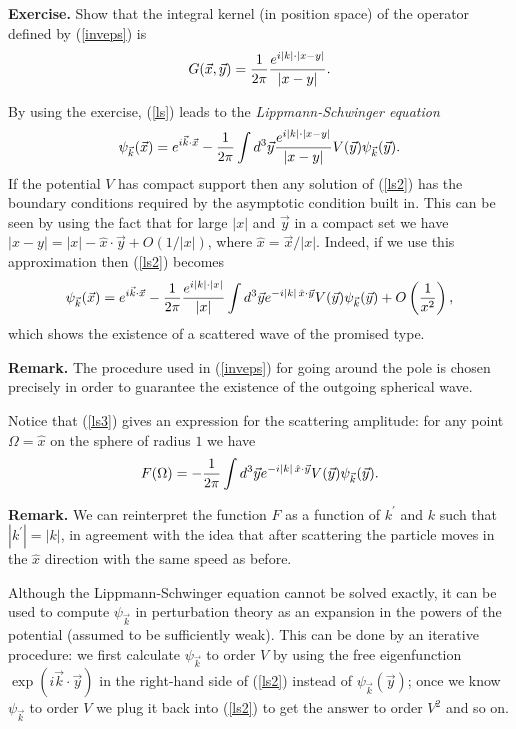 \documentclass[11pt]{article}
\def\p{\pi}
\def\O{\Omega}
\newcommand{\vk}{{\vec{k}}}
\newcommand{\vy}{{\vec{y}}}
\newcommand{\vx}{{\vec{x}}}
\newcommand{\equ}[1]{\begin{equation}{#1}\end{equation}}
\begin{document}
{\bf Exercise.} Show that the integral kernel (in position
space) of the operator defined
 by (\ref{inveps}) is
\equ{\label{intker} G(\vx,\vy) = \frac{1}{2\p} 
\frac{e^{i|k|\cdot|x-y|}}{|x-y|}. }

By using the exercise, (\ref{ls}) leads to the {\em Lippmann-Schwinger equation}
\equ{\label{ls2}\psi_\vk (\vx ) = e^{i\vk\cdot\vx}-\frac{1}{2\p} \int d^3 \vy
\frac{e^{i|k|\cdot|x-y|}}{|x-y|} V(\vy ) \psi_\vk (\vy ). }
If the potential $V$ has compact support then any solution of (\ref{ls2})
has the boundary conditions required by the asymptotic condition built in. This
can be seen by using the fact that for large $|x|$ and $\vy$ in a compact set
we have $|x-y|= |x|- \hat{x}\cdot \vy + O(1/|x| )$, where $\hat{x}= \vx/ |x|$. 
Indeed, if we use this approximation then (\ref{ls2}) becomes
\equ{ \label{ls3}\psi_\vk (\vx ) = e^{i\vk\cdot\vx}-\frac{1}{2\p}
\frac{e^{i|k|\cdot |x|}}{|x|} \int d^3 \vy e^{-i|k|\,\hat{x}\cdot\vy} V(\vy )
\psi_\vk (\vy ) + O\left( \frac{1}{x^2} \right) , }
which shows the existence of a scattered wave of the promised type. 

{\bf Remark.} The procedure used in (\ref{inveps}) for going around the pole
is chosen precisely in order to guarantee the existence of the outgoing
spherical wave.

Notice that (\ref{ls3}) gives an expression for the scattering amplitude: for any
point $\O = \hat{x}$ on the sphere of radius $1$ we have
\equ{\label{ampl}
 F(\O )= -\frac{1}{2\p} \int d^3 \vy e^{-i|k|\,\hat{x}\cdot\vy} V(\vy )
\psi_\vk (\vy ) .}

{\bf Remark.} We can reinterpret the function $F$ as a function of
$k^\prime$ and $k$ such that $|k^\prime | = |k|$, in agreement with the 
idea that after scattering the particle moves in the $\hat{x}$ direction
with the same speed as before.

Although the Lippmann-Schwinger equation cannot be solved exactly, it can be used
to compute $\psi_\vk$ in perturbation theory as an expansion in the powers of
the potential (assumed to be sufficiently weak). This can be done by an iterative
procedure: we first calculate $\psi_\vk$ to order $V$ by using the
free eigenfunction $\exp (i\vk\cdot\vy )$ in the right-hand side of (\ref{ls2})
instead of $\psi_\vk (\vy )$;
once we know $\psi_\vk$ to order $V$ we plug it back into (\ref{ls2})
to get the answer to order $V^2$ and so on.
\end{document}
